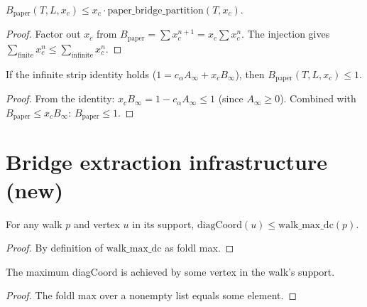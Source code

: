 \begin{lemma}
\begin{enumerate}
\begin{lemma}
\label{lem:B-paper-le-xc-bridge}
\leanok
  $B_{\text{paper}}(T,L,x_c) \leq x_c \cdot \text{paper\_bridge\_partition}(T,x_c)$.
\end{lemma}
\begin{proof}
\leanok
{}
  Factor out $x_c$ from $B_{\text{paper}} = \sum x_c^{n+1} = x_c \sum x_c^n$.
  The injection gives $\sum_{\text{finite}} x_c^n \leq \sum_{\text{infinite}} x_c^n$.
\end{proof}

\begin{lemma}
\label{lem:B-paper-le-one-from-identity}
\leanok
  If the infinite strip identity holds ($1 = c_\alpha A_\infty + x_c B_\infty$),
  then $B_{\text{paper}}(T,L,x_c) \leq 1$.
\end{lemma}
\begin{proof}
\leanok
{}
  From the identity: $x_c B_\infty = 1 - c_\alpha A_\infty \leq 1$ (since $A_\infty \geq 0$).
  Combined with $B_{\text{paper}} \leq x_c B_\infty$: $B_{\text{paper}} \leq 1$.
\end{proof}

\section{Bridge extraction infrastructure (new)}

\begin{lemma}
\label{lem:walk-max-dc-ge}
\leanok
  For any walk $p$ and vertex $u$ in its support, $\text{diagCoord}(u) \leq \text{walk\_max\_dc}(p)$.
\end{lemma}
\begin{proof}
\leanok
  By definition of $\text{walk\_max\_dc}$ as foldl max.
\end{proof}

\begin{lemma}
\label{lem:walk-max-dc-achieved}
\leanok
  The maximum diagCoord is achieved by some vertex in the walk's support.
\end{lemma}
\begin{proof}
\leanok
  The foldl max over a nonempty list equals some element.
\end{proof}


\end{enumerate}
\end{lemma}
